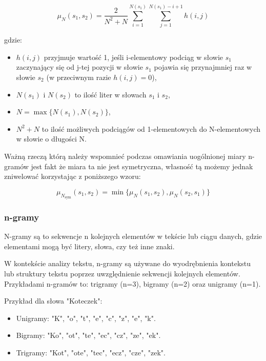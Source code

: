 \documentclass{article}
\begin{document}
\begin{equation}
\mu_N(s_1, s_2) = \frac{2}{N^2 + N} \sum_{i=1}^{N(s_1)} \sum_{j=1}^{N(s_1)-i+1} h(i, j)
\end{equation}

gdzie:

\begin{itemize}
    \item \( h(i, j) \) przyjmuje wartość 1, jeśli i-elementowy podciąg w słowie \( s_1 \) zaczynający się od j-tej pozycji w słowie \( s_1 \) pojawia się przynajmniej raz w słowie \( s_2 \) (w przeciwnym razie \( h(i, j) = 0 \)),
    \item \( N(s_1) \) i \( N(s_2) \) to ilość liter w słowach \( s_1 \) i \( s_2 \),
    \item \( N = \max\{N(s_1), N(s_2)\} \),
    \item \( N^2 + N \) to ilość możliwych podciągów od 1-elementowych do N-elementowych w słowie o długości N.
\end{itemize}

\noindent Ważną rzeczą którą należy wspomnieć podczas omawiania uogólnionej miary n-gramów jest fakt że miara ta nie jest symetryczna, własność tą możemy jednak zniwelować korzystając z poniższego wzoru:

\begin{equation}
    \mu_{N_{\text{sym}}}(s_1, s_2) = \min\{\mu_N (s_1, s_2), \mu_N (s_2, s_1)\}
\end{equation}

\subsubsection*{n-gramy}

N-gramy są to sekwencje n kolejnych elementów w tekście lub ciągu danych, gdzie elementami mogą być litery, słowa, czy też inne znaki. \newline

\noindent W kontekście analizy tekstu, n-gramy są używane do wyodrębnienia kontekstu lub struktury tekstu poprzez uwzględnienie sekwencji kolejnych elementów. Przykładami n-gramów to: trigramy (n=3), bigramy (n=2) oraz unigramy (n=1). \newline

Przykład dla słowa "Koteczek":
\begin{itemize}
    \item Unigramy: "K", "o", "t", "e", "c", "z", "e", "k".
    \item Bigramy: "Ko", "ot", "te", "ec", "cz", "ze", "ek".
    \item Trigramy: "Kot", "ote", "tec", "ecz", "cze", "zek".
\end{itemize}
\end{document}
